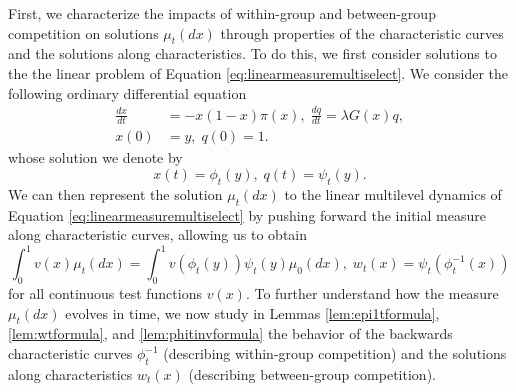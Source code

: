 \documentclass[11pt]{article}
\numberwithin{equation}{section}
\newcommand{\D}[2]{\frac{d#1}{d#2}}
\begin{document}
{First, we characterize the impacts of within-group and between-group competition on solutions $\mu_t(dx)$ through properties of the characteristic curves  and the solutions along characteristics.
To do this, we first consider solutions to the the linear problem of Equation \eqref{eq:linearmeasuremultiselect}. We consider the following ordinary differential equation
\begin{equation}\label{cODE}
\begin{split}
\D{x}{t}&=-x(1-x)\pi(x), \; \D{q}{t}=\lambda G(x) q, \\
x(0)&=y, \; q(0)=1.
\end{split}
\end{equation}
whose solution we denote by
\begin{equation}\label{phipsi}
x(t)=\phi_t (y), \; q(t)=\psi_t(y).
\end{equation}
We can then represent the solution $\mu_t(dx)$ to the linear multilevel dynamics of Equation \eqref{eq:linearmeasuremultiselect} by pushing forward the initial measure along characteristic curves, allowing us to obtain
\begin{equation} \label{eq:pushforward}
\int_0^1 v(x)\mu_t(dx)=\int_0^1 v(\phi_t(y))\psi_t(y) \mu_0(dx), \; w_t(x)=\psi_t(\phi_t^{-1} (x))
\end{equation}
for all continuous test functions $v(x)$. To further understand how the measure $\mu_t(dx)$ evolves in time, we now study in Lemmas \ref{lem:epi1tformula}, \ref{lem:wtformula}, and \ref{lem:phitinvformula} the behavior of the backwards characteristic curves $\phi_t^{-1}$ (describing within-group competition) and the solutions along characteristics $w_t(x)$ (describing between-group competition).

}
\end{document}

